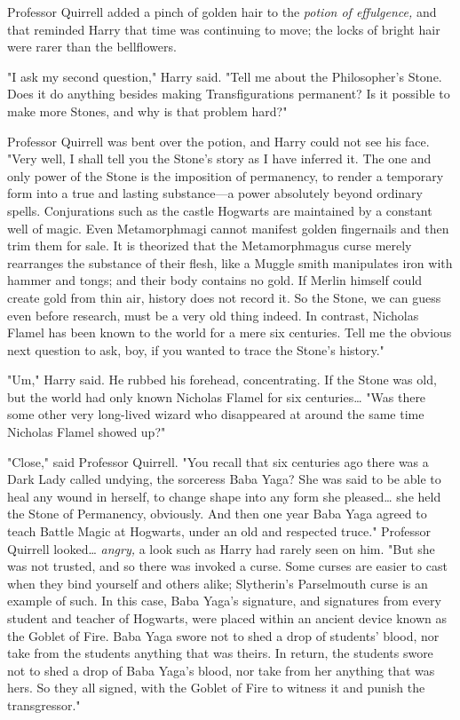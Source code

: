 Professor Quirrell added a pinch of golden hair to the \emph{potion of
effulgence,} and that reminded Harry that time was continuing to move; the
locks of bright hair were rarer than the bellflowers.

"I ask my second question," Harry said. "Tell me about the Philosopher's Stone.
Does it do anything besides making Transfigurations permanent? Is it possible
to make more Stones, and why is that problem hard?"

Professor Quirrell was bent over the potion, and Harry could not see his face.
"Very well, I shall tell you the Stone's story as I have inferred it. The one
and only power of the Stone is the imposition of permanency, to render a
temporary form into a true and lasting substance---a power absolutely beyond
ordinary spells. Conjurations such as the castle Hogwarts are maintained by a
constant well of magic. Even Metamorphmagi cannot manifest golden fingernails
and then trim them for sale. It is theorized that the Metamorphmagus curse
merely rearranges the substance of their flesh, like a Muggle smith manipulates
iron with hammer and tongs; and their body contains no gold. If Merlin himself
could create gold from thin air, history does not record it. So the Stone, we
can guess even before research, must be a very old thing indeed. In contrast,
Nicholas Flamel has been known to the world for a mere six centuries. Tell me
the obvious next question to ask, boy, if you wanted to trace the Stone's
history."

"Um," Harry said. He rubbed his forehead, concentrating. If the Stone was old,
but the world had only known Nicholas Flamel for six centuries{\ldots} "Was
there some other very long-lived wizard who disappeared at around the same time
Nicholas Flamel showed up?"

"Close," said Professor Quirrell. "You recall that six centuries ago there was
a Dark Lady called undying, the sorceress Baba Yaga? She was said to be able to
heal any wound in herself, to change shape into any form she pleased{\ldots}
she held the Stone of Permanency, obviously. And then one year Baba Yaga agreed
to teach Battle Magic at Hogwarts, under an old and respected truce." Professor
Quirrell looked{\ldots} \emph{angry,} a look such as Harry had rarely seen on
him. "But she was not trusted, and so there was invoked a curse. Some curses
are easier to cast when they bind yourself and others alike; Slytherin's
Parselmouth curse is an example of such. In this case, Baba Yaga's signature,
and signatures from every student and teacher of Hogwarts, were placed within
an ancient device known as the Goblet of Fire. Baba Yaga swore not to shed a
drop of students' blood, nor take from the students anything that was theirs.
In return, the students swore not to shed a drop of Baba Yaga's blood, nor take
from her anything that was hers. So they all signed, with the Goblet of Fire to
witness it and punish the transgressor."

